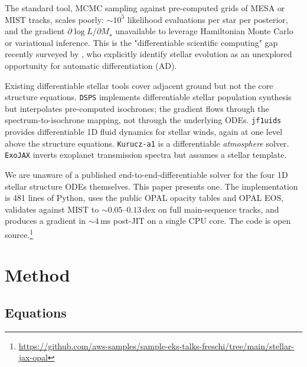 \documentclass[twocolumn]{aastex631}
\newcommand{\code}[1]{\texttt{#1}}
\begin{document}
The standard tool, MCMC sampling against pre-computed grids of MESA
\citep{2011ApJS..192....3P, 2013ApJS..208....4P, 2015ApJS..220...15P,
2018ApJS..234...34P, 2019ApJS..243...10P} or MIST
\citep{2016ApJ...823..102C} tracks, scales poorly: $\sim 10^5$ likelihood
evaluations per star per posterior, and the gradient
$\partial \log L / \partial M_\star$ unavailable to leverage Hamiltonian
Monte Carlo or variational inference. This is the
"differentiable scientific computing" gap recently surveyed by
\citet{2025arXiv...GRASP}, who explicitly identify stellar evolution as
an unexplored opportunity for automatic differentiation (AD).

Existing differentiable stellar tools cover adjacent ground but not the
core structure equations. \code{DSPS} \citep{2023MNRAS.521.1741H}
implements differentiable stellar population synthesis but interpolates
pre-computed isochrones; the gradient flows through the spectrum-to-isochrone
mapping, not through the underlying ODEs. \code{jf1uids}
\citep{2024arXiv...jf1uids} provides differentiable 1D fluid dynamics for
stellar winds, again at one level above the structure equations.
\code{Kurucz-a1} \citep{2025arXiv...Kurucz} is a differentiable
\emph{atmosphere} solver. \code{ExoJAX} \citep{2022ApJS..258...31K}
inverts exoplanet transmission spectra but assumes a stellar template.

We are unaware of a published end-to-end-differentiable solver for the
four 1D stellar structure ODEs themselves. This paper presents one. The
implementation is 481 lines of Python, uses the public OPAL opacity tables
and OPAL EOS, validates against MIST to $\sim 0.05$--$0.13\,$dex on full
main-sequence tracks, and produces a gradient in $\sim 4\,$ms post-JIT
on a single CPU core. The code is open source.\footnote{\url{https://github.com/aws-samples/sample-eks-talks-freschi/tree/main/stellar-jax-opal}}

\section{Method}

\subsection{Equations}
\end{document}
